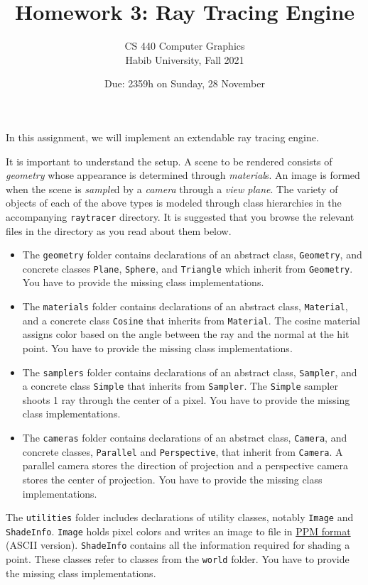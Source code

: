 \documentclass{article}
\title{Homework 3: Ray Tracing Engine}
\author{CS 440 Computer Graphics\\Habib University, Fall 2021}
\date{Due: 2359h on Sunday, 28 November}
\begin{document}
\maketitle
\thispagestyle{empty}

In this assignment, we will implement an extendable ray tracing engine.

It is important to understand the setup. A scene to be rendered consists of \emph{geometry} whose appearance is determined through \emph{material}s. An image is formed when the scene is \emph{sample}d by a \emph{camera} through a \emph{view plane}. The variety of objects of each of the above types is modeled through class hierarchies in the accompanying \texttt{raytracer} directory. It is suggested that you browse the relevant files in the directory as you read about them below.
\begin{itemize}
\item The \texttt{geometry} folder contains declarations of an abstract class, \texttt{Geometry}, and concrete classes  \texttt{Plane}, \texttt{Sphere}, and \texttt{Triangle} which inherit from \texttt{Geometry}. You have to provide the missing class implementations.
\item The \texttt{materials} folder contains declarations of an abstract class, \texttt{Material}, and a concrete class  \texttt{Cosine} that inherits from \texttt{Material}. The cosine material assigns color based on the angle between the ray and the normal at the hit point. You have to provide the missing class implementations.
\item The \texttt{samplers} folder contains declarations of an abstract class, \texttt{Sampler}, and a concrete class  \texttt{Simple} that inherits from \texttt{Sampler}. The \texttt{Simple} sampler shoots 1 ray through the center of a pixel. You have to provide the missing class implementations.
\item The \texttt{cameras} folder contains declarations of an abstract class, \texttt{Camera}, and concrete classes, \texttt{Parallel} and \texttt{Perspective}, that inherit from \texttt{Camera}. A parallel camera stores the direction of projection and a perspective camera stores the center of projection. You have to provide the missing class implementations.
\end{itemize}

The \texttt{utilities} folder includes declarations of utility classes, notably \texttt{Image} and \texttt{ShadeInfo}. \texttt{Image} holds pixel colors and writes an image to file in \href{https://en.wikipedia.org/wiki/Netpbm_format#PPM_example}{PPM format} (ASCII version). \texttt{ShadeInfo} contains all the information required for shading a point. These classes refer to classes from the \texttt{world} folder. You have to provide the missing class implementations.
\end{document}
